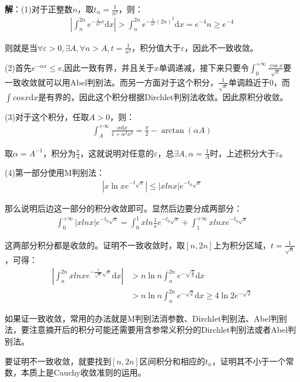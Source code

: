 \documentclass{ctexart}
\let\oldtextbf\textbf
\renewcommand{\textbf}[1]{\textcolor{brown!50!red}{\oldtextbf{#1}}}
\begin{document}
\textbf{\color{brown!50!red}解}：(1)对于正整数$n$，取$t_n=\frac{1}{n^2}$，则：
\begin{align*}
|\int_n^{2n}e^{-\frac{1}{n^2}x}\mathrm{d}x |>\int_n^{2n}e^{-\frac{1}{n^2}(2n)^2}\mathrm{d}x
=e^{-4}n\geq e^{-4}
\end{align*}

则就是当$\forall \varepsilon>0,\exists A,\forall n>A,t=\frac{1}{n^2}$，积分值大于$\varepsilon$，因此不一致收敛。

(2)首先$e^{-\alpha x}\leq e$,因此一致有界，并且关于$x$单调递减，接下来只要令$\int_0^{+\infty}\frac{\cos x}{\sqrt{x}}$要一致收敛就可以用Abel判别法。而另一方面对于这个积分，$\frac{1}{\sqrt{x}}$单调趋近于0，而$\int cosx\mathrm{d}x$是有界的，因此这个积分根据Dirchlet判别法收敛。因此原积分收敛。

(3)对于这个积分，任取$A>0$，则：
\begin{align*}
\int_A^{+\infty}\frac{\alpha\mathrm{d}x}{1+\alpha^2x^2}=\frac{\pi}{2}-\arctan(\alpha A) 
\end{align*}

取$\alpha=A^{-1}$，积分为$\frac{\pi}{4}$，这就说明对任意的$\varepsilon$，总$\exists A ,\alpha=\frac{1}{A}$时，上述积分大于$\varepsilon$。

(4)第一部分使用M判别法：
\begin{align*}
 |x\ln x e^{-t\sqrt{x}}|\leq|xln x|e^{-t_0\sqrt{x}} 
\end{align*}

那么说明后边这一部分的积分收敛即可。显然后边要分成两部分：
  \begin{align*}
\int_0^{+\infty}|xln x|e^{-t_0\sqrt{x}}=\int_0^{1}xln\frac{1}{x}e^{-t_0\sqrt{x}}+
 \int_1^{+\infty}xln xe^{-t_0\sqrt{x}}
\end{align*}  

这两部分积分都是收敛的。证明不一致收敛时，取$[n,2n]$上为积分区域，$t=\frac{1}{\sqrt{n}}$，可得：
\begin{align*}
|\int_n^{2n}xln xe^{-\frac{1}{\sqrt{n}} \sqrt{x}}\mathrm{d}x|&>n\ln n\int_n^{2n}e^{-\sqrt{
\frac{x}{n}} }\mathrm{d}x  \\
&>n\ln n\int_n^{2n} e^{-\sqrt{2}}\mathrm{d}x\ge 4\ln 2 e^{-\sqrt{2} }
\end{align*}
\begin{tcolorbox}[
    colback=bac1,     %
    colframe=fra1,   %
    coltitle=white!80,    
    coltext=tex1,%
    title=关于含参广义积分一致收敛证明,
    fonttitle=\bfseries,        %
arc=2mm,                     %
breakable
]
如果证一致收敛，常用的办法就是M判别法消参数、Dirchlet判别法、Abel判别法，要注意摘开后的积分可能还需要用含参常义积分的Dirchlet判别法或者Abel判别法。

要证明不一致收敛，就要找到$[n,2n]$区间积分和相应的$t_n$，证明其不小于一个常数，本质上是Cauchy收敛准则的运用。
\end{tcolorbox}
\end{document}
